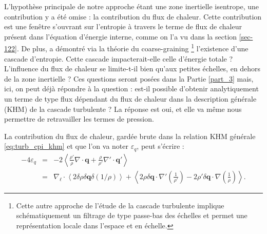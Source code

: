 L'hypothèse principale de notre approche étant une zone inertielle isentrope, une contribution y a été omise : la contribution du flux de chaleur. Cette contribution est une fenêtre s'ouvrant sur l'entropie à travers le terme de flux de chaleur présent dans l'équation d'énergie interne, comme on l'a vu dans la section \ref{sec-122}. De plus, \cite{eyink_cascades_2018} a démontré via la théorie du \og coarse-graining \fg{}\footnote{Cette autre approche de l'étude de la cascade turbulente implique schématiquement un filtrage de type passe-bas des échelles et permet une représentation locale dans l'espace et en échelle.} l'existence d'une cascade d'entropie. Cette cascade impacterait-elle celle d'énergie totale ? L'influence du flux de chaleur se limite-t-il bien qu'aux petites échelles, en dehors de la zone inertielle ? Ces questions seront posées dans la Partie \ref{part_3} mais, ici, on peut déjà répondre à la question : est-il possible d'obtenir analytiquement un terme de type flux dépendant du flux de chaleur dans la description générale (\acs{KHM}) de la cascade turbulente ? La réponse est oui, et elle va même nous permettre de retravailler les termes de pression. 

La contribution du flux de chaleur, gardée brute dans la relation \acs{KHM} générale \eqref{eq:turb_cpi_khm} et que l'on va noter $\varepsilon_{q}$, peut s'écrire :
    \begin{eqnarray}
    \label{eq:turb_ref_q}    - 4\varepsilon_{q}  &=& - 2 \left<\frac{\rho'}{\rho} \nabla \cdot \boldsymbol{q} + \frac{\rho}{\rho'} \nabla' \cdot \boldsymbol{q'}\right>\nonumber\\
        &=&\nabla_{\boldsymbol{\ell}} \cdot \left<2\delta \rho \delta \boldsymbol{q}\delta \left(1/\rho\right) \right> + \left< 2\rho  \delta \boldsymbol{q} \cdot \nabla'\left(\frac{1}{\rho'}\right) -  2\rho' \delta \boldsymbol{q} \cdot \nabla \left(\frac{1}{\rho}\right)\right> .
    \end{eqnarray}

